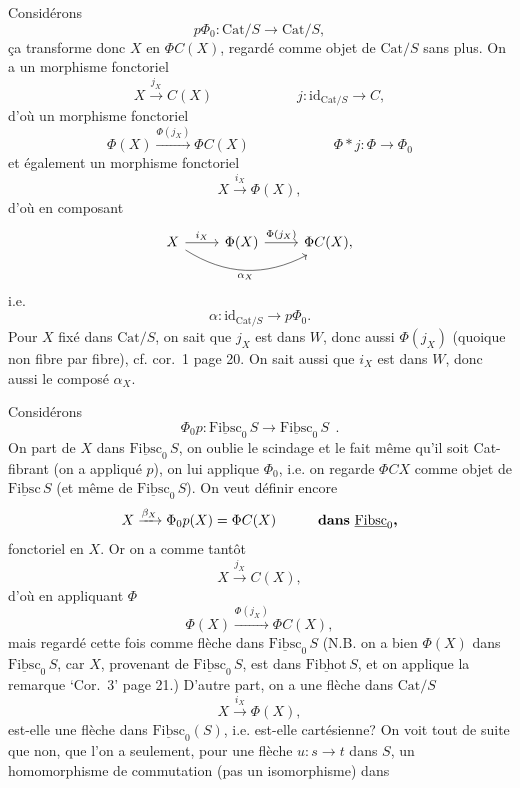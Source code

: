 \documentclass[11pt]{article}
\newcommand{\printedpage}[1]{\marginpar{\footnotesize p.~#1}}
\newcommand{\msp}[1]{\marginpar{\footnotesize [#1]}}
\newcommand{\und}[1]{\underline{\mathrm{#1}}}
\newcommand{\Cat}{\mathrm{Cat}}
\begin{document}
\msp{page 29}
Considérons
\[ p\Phi_0 : \Cat/S \longrightarrow \Cat/S, \]
ça transforme donc $X$ en $\Phi C(X)$, regardé comme objet de $\Cat/S$ sans plus. On a un morphisme fonctoriel
\[ X \xrightarrow{j_X} C(X) \qquad\qquad\qquad j : \mathrm{id}_{\Cat/S} \longrightarrow C, \]
\printedpage{18}
d'où un morphisme fonctoriel
\[ \Phi(X) \xrightarrow{\Phi(j_X)} \Phi C(X) \qquad\qquad\qquad \Phi * j : \Phi \longrightarrow \Phi_0 \]
et également un morphisme fonctoriel
\[ X \xrightarrow{i_X} \Phi(X), \]
d'où en composant
\[
\begin{tikzcd}
X \arrow[r, "i_X"] \arrow[rr, bend right, "\alpha_X"'] & \Phi(X) \arrow[r, "\Phi(j_X)"] & \Phi C(X),
\end{tikzcd}
\]
i.e.
\[ \alpha : \mathrm{id}_{\Cat/S} \longrightarrow p\Phi_0. \]
Pour $X$ fixé dans $\Cat/S$, on sait que $j_X$ est dans $W$, donc aussi $\Phi(j_X)$ (quoique non fibre par fibre), cf. cor.~1 page 20. On sait aussi que $i_X$ est dans $W$, donc aussi le composé $\alpha_X$.

Considérons
\[ \Phi_0 p : \und{Fibsc}_0\,S \longrightarrow \und{Fibsc}_0\,S\ \ . \]
On part de $X$ dans $\und{Fibsc}_0\,S$, on oublie le scindage et le fait même qu'il soit Cat-fibrant
\msp{page 30}
(on a appliqué $p$), on lui applique $\Phi_0$, i.e. on regarde $\Phi CX$ comme objet de $\und{Fibsc}\,S$ (et même de $\und{Fibsc}_0\,S$). On veut définir encore
\[ X \xrightarrow{\beta_X} \Phi_0 p(X) = \Phi C(X) \qquad\quad \text{\textbf{dans} } \und{Fibsc}_0\text{\textbf{,}} \] %
fonctoriel en $X$. Or on a comme tantôt
\[ X \xrightarrow{j_X} C(X), \]
d'où en appliquant $\Phi$
\[ \Phi(X) \xrightarrow{\Phi(j_X)} \Phi C(X), \]
mais regardé cette fois comme flèche dans $\und{Fibsc}_0\,S$ (N.B. on a bien $\Phi(X)$ dans $\und{Fibsc}_0\,S$, car $X$, provenant de $\und{Fibsc}_0\,S$, est dans $\und{Fibhot}\,S$, et on applique la remarque `Cor.~3' page 21.) D'autre part, on a une flèche dans $\Cat/S$
\[ X \xrightarrow{i_X} \Phi(X), \]
est-elle une flèche dans $\und{Fibsc}_0(S)$, i.e. est-elle cartésienne? On voit tout de suite que non, que l'on a seulement, pour une flèche $u : s \longrightarrow t$ dans $S$, un homomorphisme de commutation (pas un isomorphisme) dans
\end{document}
